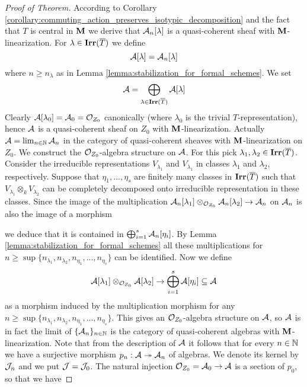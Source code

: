 \begin{proof}[Proof of Theorem]
According to Corollary \ref{corollary:commuting_action_preserves_isotypic_decomposition} and the fact that $T$ is central in $\mathbf{M}$ we derive that ${\mathcal A}_n[\lambda]$ is a quasi-coherent sheaf with $\mathbf{M}$-linearization. For $\lambda\in \mathbf{Irr}(\overline{T})$ we define
$${\mathcal A}[\lambda] = {\mathcal A}_n[\lambda]$$
where $n\geq n_{\lambda}$ as in Lemma \ref{lemma:stabilization_for_formal_schemes}. We set
$${\mathcal A}=\bigoplus_{\lambda\in \mathbf{Irr}(\overline{T})}{\mathcal A}[\lambda]$$
Clearly ${\mathcal A}[\lambda_0] = {\mathcal A}_0 = {\mathcal O}_{Z_0}$ canonically (where $\lambda_0$ is the trivial $T$-representation), hence ${\mathcal A}$ is a quasi-coherent sheaf on $Z_0$ with $\mathbf{M}$-linearization. Actually ${\mathcal A}=\lim_{n\in {\mathbb N}}{\mathcal A}_n$ in the category of quasi-coherent sheaves with $\mathbf{M}$-linearization on $Z_0$. We construct the ${\mathcal O}_{Z_0}$-algebra structure on ${\mathcal A}$. For this pick $\lambda_1, \lambda_2\in \mathbf{Irr}(\overline{T})$. Consider the irreducible representations $V_{\lambda_1}$ and $V_{\lambda_1}$ in classes $\lambda_1$ and $\lambda_2$, respectively. Suppose that $\eta_1,...,\eta_s$ are finitely many classes in $\mathbf{Irr}(\overline{T})$ such that $V_{\lambda_1}\otimes_k V_{\lambda_2}$ can be completely decomposed onto irreducible representation in these classes. Since the image of the multiplication ${\mathcal A}_n[\lambda_1]\otimes_{{\mathcal O}_{Z_0}}{\mathcal A}_n[\lambda_2]\rightarrow {\mathcal A}_n$ on ${\mathcal A}_n$ is also the image of a morphism
\begin{center}
\end{center}
we deduce that it is contained in $\bigoplus_{i=1}^s{\mathcal A}_n[\eta_i]$. By Lemma \ref{lemma:stabilization_for_formal_schemes} all these multiplications for $n\geq \sup \{n_{\lambda_1},n_{\lambda_2},n_{\eta_1},...,n_{\eta_s}\}$ can be identified. Now we define
$${\mathcal A}[\lambda_1]\otimes_{{\mathcal O}_{Z_0}} {\mathcal A}[\lambda_2]\rightarrow  \bigoplus_{i=1}^s{\mathcal A}[\eta_i]\subseteq {\mathcal A}$$
as a morphism induced by the multiplication morphism for any $n\geq \sup\{n_{\lambda_1},n_{\lambda_2},n_{\eta_1},...,n_{\eta_s}\}$. This gives an ${\mathcal O}_{Z_0}$-algebra structure on ${\mathcal A}$, so ${\mathcal A}$ is in fact the limit of $\{{\mathcal A}_n\}_{n\in {\mathbb N}}$ is the category of quasi-coherent algebras with $\mathbf{M}$-linearization. Note that from the description of ${\mathcal A}$ it follows that for every $n\in {\mathbb N}$ we have a surjective morphism $p_n:{\mathcal A}\twoheadrightarrow {\mathcal A}_n$ of algebras. We denote its kernel by ${\mathcal J}_n$ and we put ${\mathcal J} = {\mathcal J}_0$. The natural injection ${\mathcal O}_{Z_0} = {\mathcal A}_0 \rightarrow {\mathcal A}$ is a section of $p_0$, so that we have

\end{proof}
